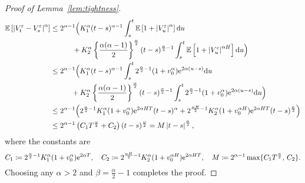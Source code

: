 \begin{proof}[Proof of Lemma~\ref{lem:tightness}]
\begin{align*}
\mathbb{E}\left[\left\vert V_t^\varepsilon - V_s^\varepsilon\right\vert^\alpha\right] 
&\leq 2^{\alpha-1}\Big(K_1^\alpha(t-s)^{\alpha-1}\int_s^t \mathbb{E}\left[ 1 + \left| V_u^\varepsilon\right|^\alpha \right]\mathrm{d} u \\ 
& \quad \quad \quad + K_2^\alpha \left\{\frac{\alpha(\alpha-1)}{2}\right\}^{\frac{\alpha}{2}} (t-s)^{\frac{\alpha}{2}-1} \int_s^t \mathbb{E}\left[1 +  \left| V_u^\varepsilon\right|^{\alpha H} \right] \mathrm{d} u\Big)\\
&\leq 2^{\alpha-1}\Big(K_1^\alpha(t-s)^{\alpha-1}\int_s^t 2^{\frac{\alpha}{2}-1}(1 + v_0^\alpha)\mathrm{e}^{2\alpha(u-s)} \mathrm{d} u \\ & ~\quad \quad \:\; + K_2^\alpha \left\{\frac{\alpha(\alpha-1)}{2}\right\}^{\frac{\alpha}{2}} (t-s)^{\frac{\alpha}{2}-1} \int_s^t 2^{\frac{\alpha}{2}-1}(1 + v_0^\alpha)\mathrm{e}^{2\alpha(u-s)} \mathrm{d} u\Big)\\
&\leq 2^{\alpha-1} \Big(2^{\frac{\alpha}{2}-1} K_1^{\alpha} (1+v_0^\alpha)\mathrm{e}^{2\alpha H T} (t-s)^\alpha +  2^{\frac{\alpha H}{2}-1} K_2^{\alpha} (1+v_0^{\alpha H})\mathrm{e}^{2\alpha H T} (t-s)^{\frac{\alpha}{2}} \Big) \\
&\leq 2^{\alpha-1}\left(C_1 T^{\frac{\alpha}{2}} + C_2\right)(t-s)^{\frac{\alpha}{2}}
= M \left\vert t - s\right\vert^{\frac{\alpha}{2}},
\end{align*}
where the constants are 
$$
C_1\coloneqq 2^{\frac{\alpha}{2}-1} K_1^{\alpha} (1+v_0^\alpha)\mathrm{e}^{2\alpha T},
\quad
C_2\coloneqq 2^{\frac{\alpha H}{2}-1} K_2^{\alpha} (1+v_0^{\alpha H})\mathrm{e}^{2\alpha H T},
\quad
M\coloneqq 2^{\alpha-1}\max\{C_1 T^{\frac{\alpha}{2}}, \, C_2\}.
$$
Choosing any $\alpha > 2$ and $\beta = \frac{\alpha}{2}-1$ completes the proof.
\end{proof}

